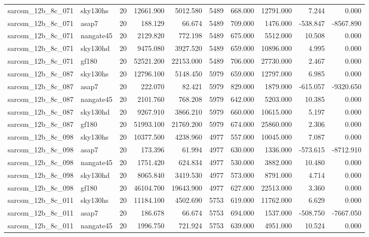 \begin{tabular}{llrrrrrrrr}
sarcsm\_12b\_8c\_071 & sky130hs & 20 & 12661.900 & 5012.580 & 5489 & 668.000 & 12791.000 & 7.244 & 0.000 \\
sarcsm\_12b\_8c\_071 & asap7 & 20 & 188.129 & 66.674 & 5489 & 709.000 & 1476.000 & -538.847 & -8567.890 \\
sarcsm\_12b\_8c\_071 & nangate45 & 20 & 2129.820 & 772.198 & 5489 & 675.000 & 5512.000 & 10.508 & 0.000 \\
sarcsm\_12b\_8c\_071 & sky130hd & 20 & 9475.080 & 3927.520 & 5489 & 659.000 & 10896.000 & 4.995 & 0.000 \\
sarcsm\_12b\_8c\_071 & gf180 & 20 & 52521.200 & 22153.000 & 5489 & 706.000 & 27730.000 & 2.467 & 0.000 \\
sarcsm\_12b\_8c\_087 & sky130hs & 20 & 12796.100 & 5148.450 & 5979 & 659.000 & 12797.000 & 6.985 & 0.000 \\
sarcsm\_12b\_8c\_087 & asap7 & 20 & 222.070 & 82.421 & 5979 & 829.000 & 1879.000 & -615.057 & -9320.650 \\
sarcsm\_12b\_8c\_087 & nangate45 & 20 & 2101.760 & 768.208 & 5979 & 642.000 & 5203.000 & 10.385 & 0.000 \\
sarcsm\_12b\_8c\_087 & sky130hd & 20 & 9267.910 & 3866.210 & 5979 & 660.000 & 10615.000 & 5.197 & 0.000 \\
sarcsm\_12b\_8c\_087 & gf180 & 20 & 51993.100 & 21769.200 & 5979 & 674.000 & 25860.000 & 2.306 & 0.000 \\
sarcsm\_12b\_8c\_098 & sky130hs & 20 & 10377.500 & 4238.960 & 4977 & 557.000 & 10045.000 & 7.087 & 0.000 \\
sarcsm\_12b\_8c\_098 & asap7 & 20 & 173.396 & 61.994 & 4977 & 630.000 & 1336.000 & -573.615 & -8712.910 \\
sarcsm\_12b\_8c\_098 & nangate45 & 20 & 1751.420 & 624.834 & 4977 & 530.000 & 3882.000 & 10.480 & 0.000 \\
sarcsm\_12b\_8c\_098 & sky130hd & 20 & 8065.840 & 3419.530 & 4977 & 573.000 & 8791.000 & 4.714 & 0.000 \\
sarcsm\_12b\_8c\_098 & gf180 & 20 & 46104.700 & 19643.900 & 4977 & 627.000 & 22513.000 & 3.360 & 0.000 \\
sarcsm\_12b\_8c\_011 & sky130hs & 20 & 11184.100 & 4502.690 & 5753 & 619.000 & 11762.000 & 6.629 & 0.000 \\
sarcsm\_12b\_8c\_011 & asap7 & 20 & 186.678 & 66.674 & 5753 & 694.000 & 1537.000 & -508.750 & -7667.050 \\
sarcsm\_12b\_8c\_011 & nangate45 & 20 & 1996.750 & 721.924 & 5753 & 639.000 & 4951.000 & 10.524 & 0.000 \\

\end{tabular}
